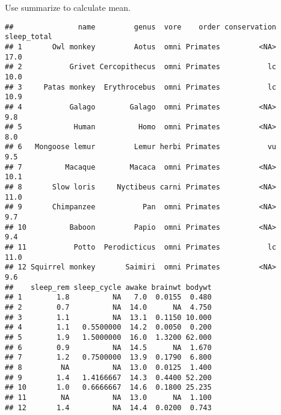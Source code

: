 Use summarize to calculate mean.

\begin{Shaded}
\begin{Highlighting}[]
\end{Highlighting}
\end{Shaded}

\begin{verbatim}
##               name         genus  vore    order conservation sleep_total
## 1       Owl monkey         Aotus  omni Primates         <NA>        17.0
## 2           Grivet Cercopithecus  omni Primates           lc        10.0
## 3     Patas monkey  Erythrocebus  omni Primates           lc        10.9
## 4           Galago        Galago  omni Primates         <NA>         9.8
## 5            Human          Homo  omni Primates         <NA>         8.0
## 6   Mongoose lemur         Lemur herbi Primates           vu         9.5
## 7          Macaque        Macaca  omni Primates         <NA>        10.1
## 8       Slow loris     Nyctibeus carni Primates         <NA>        11.0
## 9       Chimpanzee           Pan  omni Primates         <NA>         9.7
## 10          Baboon         Papio  omni Primates         <NA>         9.4
## 11           Potto  Perodicticus  omni Primates           lc        11.0
## 12 Squirrel monkey       Saimiri  omni Primates         <NA>         9.6
##    sleep_rem sleep_cycle awake brainwt bodywt
## 1        1.8          NA   7.0  0.0155  0.480
## 2        0.7          NA  14.0      NA  4.750
## 3        1.1          NA  13.1  0.1150 10.000
## 4        1.1   0.5500000  14.2  0.0050  0.200
## 5        1.9   1.5000000  16.0  1.3200 62.000
## 6        0.9          NA  14.5      NA  1.670
## 7        1.2   0.7500000  13.9  0.1790  6.800
## 8         NA          NA  13.0  0.0125  1.400
## 9        1.4   1.4166667  14.3  0.4400 52.200
## 10       1.0   0.6666667  14.6  0.1800 25.235
## 11        NA          NA  13.0      NA  1.100
## 12       1.4          NA  14.4  0.0200  0.743
\end{verbatim}

\begin{Shaded}
\begin{Highlighting}[]
\StringTok{ }\OperatorTok{==}\NormalTok{) }\OperatorTok{\%\textgreater{}\%}\StringTok{ }\NormalTok{(}  \NormalTok{())}
\end{Highlighting}
\end{Shaded}

